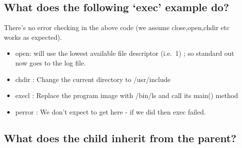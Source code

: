 \subsection{\texorpdfstring{What does the following `exec' example
do?}{What does the following exec example do?}}\label{what-does-the-following-exec-example-do}

\begin{Shaded}
\begin{Highlighting}[]
 
   \NormalTok{); }
   \NormalTok{);}
   \NormalTok{);}

   \NormalTok{, } \NormalTok{, }\NormalTok{, (} 
   \NormalTok{);}
    \NormalTok{; }
\NormalTok{\}}
\end{Highlighting}
\end{Shaded}

There's no error checking in the above code (we assume close,open,chdir
etc works as expected).

\begin{itemize}
\itemsep1pt\parskip0pt
\item
  open: will use the lowest available file descriptor (i.e.~1) ; so
  standard out now goes to the log file.
\item
  chdir : Change the current directory to /usr/include
\item
  execl : Replace the program image with /bin/ls and call its main()
  method
\item
  perror : We don't expect to get here - if we did then exec failed.
\end{itemize}

\subsection{What does the child inherit from the
parent?}\label{what-does-the-child-inherit-from-the-parent}

